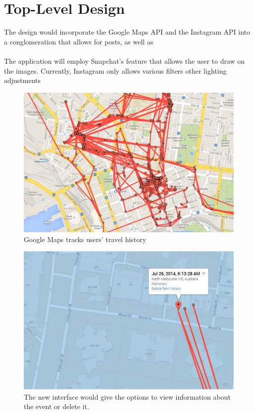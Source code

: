 \documentclass[11pt]{article}
\begin{document}
\section{Top-Level Design}
\label{Top-Level Design}
   \indent 
   \indent The design would incorporate the Google Maps API and the Instagram API into a conglomeration that allows for posts, as well as 
   \\ \\
   \indent The application will employ Snapchat's feature that allows the user to draw on the images. Currently, Instagram only allows various filters other lighting adjustments
    \\
\begin{figure}[ht]
\centering
\includegraphics[width=5in]{images/google_maps_tracking.png}
\caption{Google Maps tracks users' travel history}
\label{google_tracking}
\end{figure}

\begin{figure}[ht]
\centering
\includegraphics[width=5in]{images/google_maps_tracking_with_info.png}
\caption{The new interface would give the options to view information about the event or delete it.}
\label{google_tracking}
\end{figure}
\end{document}
